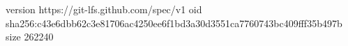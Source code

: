 version https://git-lfs.github.com/spec/v1
oid sha256:c43e6dbb62c3e81706ac4250ee6f1bd3a30d3551ca7760743bc409fff35b497b
size 262240
